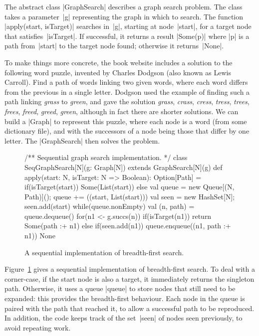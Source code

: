 
The abstract class |GraphSearch| describes a graph search problem.  The class
takes a parameter~|g| representing the graph in which to search.  The function
|apply(start, isTarget)| searches in~|g|, starting at node~|start|, for a
target node that satisfies~|isTarget|.  If successful, it returns a result
|Some(p)| where |p| is a path from~|start| to the target node found; otherwise
it returns~|None|. 

\def\word#1{\emph{#1}}

To make things more concrete, the book website includes a solution to the
following word puzzle, invented by Charles Dodgson (also known as Lewis
Carroll).  Find a path of words linking two given words, where each word
differs from the previous in a single letter.  Dodgson used the example of
finding such a path linking \word{grass} to \word{green}, and gave the
solution \word{grass}, \word{crass}, \word{cress}, \word{tress}, \word{trees},
\word{frees}, \word{freed}, \word{greed}, \word{green}, although in fact there
are shorter solutions.  We can build a |Graph| to represent this puzzle, where
each node is a word (from some dictionary file), and with the successors of a
node being those that differ by one letter.  The |GraphSearch| then solves the
problem.


\begin{figure}
\begin{scala}
/** Sequential graph search implementation. */
class SeqGraphSearch[N](g: Graph[N]) extends GraphSearch[N](g){
  def apply(start: N, isTarget: N => Boolean): Option[Path] = {
    if(isTarget(start)) Some(List(start))
    else{
      val queue = new Queue[(N, Path)](); queue += ((start, List(start)))
      val seen = new HashSet[N]; seen.add(start)
      while(queue.nonEmpty){
        val (n, path) = queue.dequeue()
        for(n1 <- g.succs(n)){
          if(isTarget(n1)) return Some(path :+ n1)
          else if(seen.add(n1)) queue.enqueue((n1, path :+ n1))
        }
      }
      None
    }
  }
}
\end{scala}
\caption{A sequential implementation of breadth-first search.}
\label{fig:bfs-seq}
\end{figure}


Figure~\ref{fig:bfs-seq} gives a sequential implementation of breadth-first
search.  To deal with a corner-case, if the start node is also a target, it
immediately returns the singleton path.  Otherwise, it uses a queue |queue| to
store nodes that still need to be expanded: this provides the breadth-first
behaviour.  Each node in the queue is paired with the path that reached it, to
allow a successful path to be reproduced.  In addition, the code keeps track
of the set~|seen| of nodes seen previously, to avoid repeating work.


